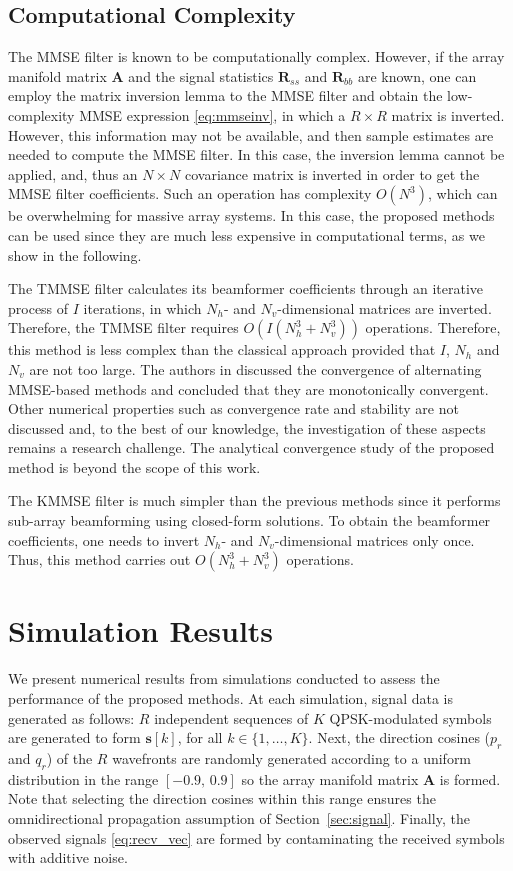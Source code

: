 \documentclass{cta-author}
\newcommand{\Rss}{\bm{R}_{ss}}
\newcommand{\Rbb}{\bm{R}_{bb}}
\begin{document}
\subsection{Computational Complexity} \label{sec:comp}

The MMSE filter is known to be computationally complex. However, if the array manifold matrix $\bm{A}$ and the signal statistics $\Rss$ and $\Rbb$ are known, one can employ the matrix inversion lemma to the MMSE filter and obtain the low-complexity MMSE expression \eqref{eq:mmseinv}, in which a $R\times R$ matrix is inverted. However, this information may not be available, and then sample estimates are needed to compute the MMSE filter. In this case, the inversion lemma cannot be applied, and, thus an $N\times N$ covariance matrix is inverted in order to get the MMSE filter coefficients. Such an operation has complexity $O(N^3)$, which can be overwhelming for massive array systems. In this case, the proposed methods can be used since they are much less expensive in computational terms, as we show in the following.

The TMMSE filter calculates its beamformer coefficients through an iterative process of $I$ iterations, in which $N_h$- and $N_v$-dimensional matrices are inverted. Therefore, the TMMSE filter requires $O(I(N_h^3 + N_v^3))$ operations. Therefore, this method is less complex than the classical approach provided that $I$, $N_h$ and $N_v$ are not too large. The authors in \cite{yener_interference_2001} discussed the convergence of alternating MMSE-based methods and concluded that they are monotonically convergent. Other numerical properties such as convergence rate and stability are not discussed and, to the best of our knowledge, the investigation of these aspects remains a research challenge. The analytical convergence study of the proposed method is beyond the scope of this work.

The KMMSE filter is much simpler than the previous methods since it performs sub-array beamforming using closed-form solutions. To obtain the beamformer coefficients, one needs to invert $N_h$- and $N_v$-dimensional matrices only once. Thus, this method carries out $O(N_h^3 + N_v^3)$ operations.

\section{Simulation Results} \label{sec:simulations}

We present numerical results from simulations conducted to assess the performance of the proposed methods. At each simulation, signal data is generated as follows: $R$ independent sequences of $K$ QPSK-modulated symbols are generated to form $\bm{s}[k]$, for all $k \in \{1,\ldots,K\}$. Next, the direction cosines ($p_r$ and $q_r$) of the $R$ wavefronts are randomly generated according to a uniform distribution in the range $[-0.9,\,0.9]$ so the array manifold matrix $\bm{A}$ is formed. Note that selecting the direction cosines within this range ensures the omnidirectional propagation assumption of Section~\ref{sec:signal}. Finally, the observed signals \eqref{eq:recv_vec} are formed by contaminating the received symbols with additive noise.
\end{document}
